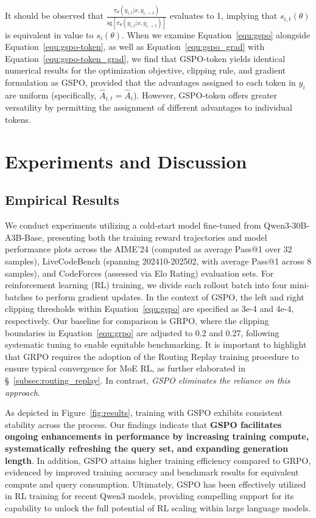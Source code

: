 It should be observed that $\frac{ \pi_{\theta} (y_{i,t} | x, y_{i,<t}) }{ \mathrm{sg} \left[ \pi_{\theta} (y_{i,t} | x, y_{i,<t}) \right] }$ evaluates to 1, implying that $s_{i,t}(\theta)$ is equivalent in value to $s_{i}(\theta)$. When we examine Equation~\eqref{equ:gspo} alongside Equation~\eqref{equ:gspo-token}, as well as Equation~\eqref{equ:gspo_grad} with Equation~\eqref{equ:gspo-token_grad}, we find that GSPO-token yields identical numerical results for the optimization objective, clipping rule, and gradient formulation as GSPO, provided that the advantages assigned to each token in $y_i$ are uniform (specifically, $\widehat{A}_{i,t} = \widehat{A}_{i}$). However, GSPO-token offers greater versatility by permitting the assignment of different advantages to individual tokens.

\section{Experiments and Discussion}

\subsection{Empirical Results}

We conduct experiments utilizing a cold-start model fine-tuned from Qwen3-30B-A3B-Base, presenting both the training reward trajectories and model performance plots across the AIME'24 (computed as average Pass@1 over 32 samples), LiveCodeBench (spanning 202410-202502, with average Pass@1 across 8 samples), and CodeForces (assessed via Elo Rating) evaluation sets. For reinforcement learning (RL) training, we divide each rollout batch into four mini-batches to perform gradient updates. In the context of GSPO, the left and right clipping thresholds within Equation~\eqref{equ:gspo} are specified as 3e-4 and 4e-4, respectively. Our baseline for comparison is GRPO, where the clipping boundaries in Equation~\eqref{equ:grpo} are adjusted to 0.2 and 0.27, following systematic tuning to enable equitable benchmarking. It is important to highlight that GRPO requires the adoption of the Routing Replay training procedure to ensure typical convergence for MoE RL, as further elaborated in \S~\ref{subsec:routing_replay}. In contrast, \textit{GSPO eliminates the reliance on this approach}.

As depicted in Figure~\ref{fig:results}, training with GSPO exhibits consistent stability across the process. Our findings indicate that \textbf{GSPO facilitates ongoing enhancements in performance by increasing training compute, systematically refreshing the query set, and expanding generation length}. In addition, GSPO attains higher training efficiency compared to GRPO, evidenced by improved training accuracy and benchmark results for equivalent compute and query consumption. Ultimately, GSPO has been effectively utilized in RL training for recent Qwen3 models, providing compelling support for its capability to unlock the full potential of RL scaling within large language models.

